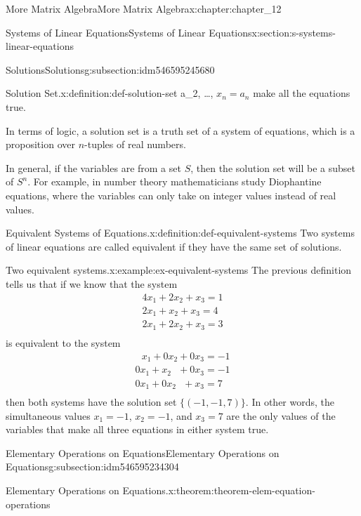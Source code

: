 \documentclass[oneside,10pt,]{book}
\numberwithin{equation}{section}
\begin{document}
\begin{chapterptx}{More Matrix Algebra}{}{More Matrix Algebra}{}{}{x:chapter:chapter_12}
\begin{sectionptx}{Systems of Linear Equations}{}{Systems of Linear Equations}{}{}{x:section:s-systems-linear-equations}
\begin{subsectionptx}{Solutions}{}{Solutions}{}{}{g:subsection:idm546595245680}
\begin{definition}{Solution Set.}{x:definition:def-solution-set}
a_2, \ldots\), \(x_n= a_n\) make all the equations true.%
\end{definition}
In terms of logic, a solution set is a truth set of a system of equations, which is a proposition over \(n\)-tuples of real numbers.%
\par
In general, if the variables are from a set \(S\), then the solution set will be a subset of \(S^n\). For example, in number theory mathematicians study Diophantine equations, where the variables can only take on integer values instead of real values.%
\begin{definition}{Equivalent Systems of Equations.}{x:definition:def-equivalent-systems}%
Two systems of linear equations are called equivalent if they have the same set of solutions.%
\end{definition}
\begin{example}{Two equivalent systems.}{x:example:ex-equivalent-systems}%
The previous definition tells us that if we know that the system%
\begin{equation*}
\begin{array}{l}
4 x_1+2 x_2+x_3=1 \\
2 x_1+x_2+x_3=4 \\
2 x_1+2 x_2+x_3=3 \\
\end{array}
\end{equation*}
is equivalent to the system%
\begin{equation*}
\begin{array}{l}
\text{   }x_1+0 x_2+0x_3=-1 \\
0 x_1+x_2\text{   }+0x_3=-1 \\
0 x_1+0 x_2\text{   }+x_3= 7 \\
\end{array}
\end{equation*}
then both systems have the solution set \(\{(-1, -1, 7)\}\). In other words, the simultaneous values \(x_1=-1\), \(x_2= -1\), and \(x_3= 7\) are the only values of the variables that make all three equations in either system true.%
\end{example}
\end{subsectionptx}
%
%
\typeout{************************************************}
\typeout{************************************************}
%
\begin{subsectionptx}{Elementary Operations on Equations}{}{Elementary Operations on Equations}{}{}{g:subsection:idm546595234304}
\begin{theorem}{Elementary Operations on Equations.}{}{x:theorem:theorem-elem-equation-operations}%

\end{theorem}
\end{subsectionptx}
\end{sectionptx}
\end{chapterptx}
\end{document}
